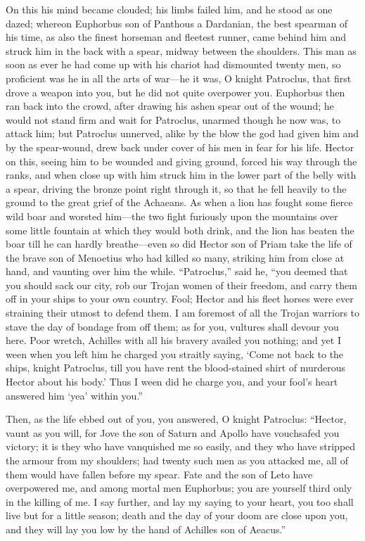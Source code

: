 On this his mind became clouded; his limbs failed him, and he stood as one
dazed; whereon Euphorbus son of Panthous a Dardanian, the best spearman of
his time, as also the finest horseman and fleetest runner, came behind him
and struck him in the back with a spear, midway between the shoulders.
This man as soon as ever he had come up with his chariot had dismounted
twenty men, so proficient was he in all the arts of war—he it was, O
knight Patroclus, that first drove a weapon into you, but he did not quite
overpower you. Euphorbus then ran back into the crowd, after drawing his
ashen spear out of the wound; he would not stand firm and wait for
Patroclus, unarmed though he now was, to attack him; but Patroclus
unnerved, alike by the blow the god had given him and by the spear-wound,
drew back under cover of his men in fear for his life. Hector on this,
seeing him to be wounded and giving ground, forced his way through the
ranks, and when close up with him struck him in the lower part of the
belly with a spear, driving the bronze point right through it, so that he
fell heavily to the ground to the great grief of the Achaeans. As when a
lion has fought some fierce wild boar and worsted him—the two fight
furiously upon the mountains over some little fountain at which they would
both drink, and the lion has beaten the boar till he can hardly breathe—even
so did Hector son of Priam take the life of the brave son of Menoetius who
had killed so many, striking him from close at hand, and vaunting over him
the while. “Patroclus,” said he, “you deemed that you should sack our
city, rob our Trojan women of their freedom, and carry them off in your
ships to your own country. Fool; Hector and his fleet horses were ever
straining their utmost to defend them. I am foremost of all the Trojan
warriors to stave the day of bondage from off them; as for you, vultures
shall devour you here. Poor wretch, Achilles with all his bravery availed
you nothing; and yet I ween when you left him he charged you straitly
saying, ‘Come not back to the ships, knight Patroclus, till you have rent
the blood-stained shirt of murderous Hector about his body.’ Thus I ween
did he charge you, and your fool’s heart answered him ‘yea’ within you.”

Then, as the life ebbed out of you, you answered, O knight Patroclus:
“Hector, vaunt as you will, for Jove the son of Saturn and Apollo have
vouchsafed you victory; it is they who have vanquished me so easily, and
they who have stripped the armour from my shoulders; had twenty such men
as you attacked me, all of them would have fallen before my spear. Fate
and the son of Leto have overpowered me, and among mortal men Euphorbus;
you are yourself third only in the killing of me. I say further, and lay
my saying to your heart, you too shall live but for a little season; death
and the day of your doom are close upon you, and they will lay you low by
the hand of Achilles son of Aeacus.”

